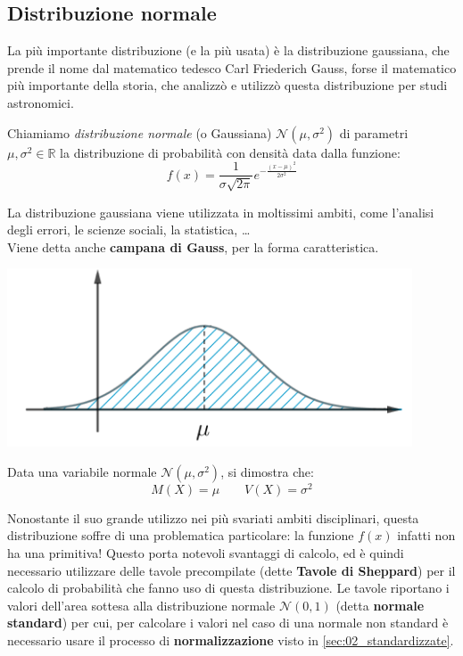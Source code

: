 \subsection{Distribuzione normale}

La più importante distribuzione (e la più usata)  è la distribuzione gaussiana, che prende il nome dal matematico tedesco Carl Friederich Gauss, forse il matematico più importante della storia, che analizzò e utilizzò questa distribuzione per studi astronomici.

\begin{definizione} Chiamiamo \emph{distribuzione normale} (o Gaussiana) \(\mathcal{N}(\mu,\sigma^2)\) di parametri \(\mu, \sigma^2 \in \mathbb{R}\) la distribuzione di probabilità con densità data dalla funzione:
\[f(x) =  \frac{1}{\sigma \sqrt{2 \pi}} e^{-\frac{(x-\mu)^2}{2 \sigma^2}}\]
\end{definizione}

\begin{minipage}[c]{.45\textwidth}
La distribuzione gaussiana viene utilizzata in moltissimi ambiti, come l'analisi degli errori, le scienze sociali, la statistica, \dots \\
Viene detta anche \textbf{campana di Gauss}, per la forma caratteristica.
\end{minipage}
\begin{minipage}[c]{.55\textwidth}
\begin{center}
  \includegraphics[width=0.9\textwidth]{img/Normale.png}
\end{center}
\end{minipage}

\begin{proprieta} Data una variabile normale \(\mathcal{N}(\mu, \sigma^2)\), si dimostra che: 
\[\boxed{M(X) =\mu} \qquad \boxed{V(X) = \sigma^2}\]
\end{proprieta}

Nonostante il suo grande utilizzo nei più svariati ambiti disciplinari, questa distribuzione soffre di una problematica particolare: la funzione \(f(x)\) infatti non ha una primitiva! Questo porta notevoli svantaggi di calcolo, ed è quindi necessario utilizzare delle tavole precompilate (dette \textbf{Tavole di Sheppard}) per il calcolo di probabilità che fanno uso di questa distribuzione. Le tavole riportano i valori dell'area sottesa alla distribuzione normale \(\mathcal{N} (0,1)\) (detta \textbf{normale standard}) per cui, per calcolare i valori nel caso di una normale non standard è necessario usare il processo di \textbf{normalizzazione} visto in \ref{sec:02_standardizzate}.

